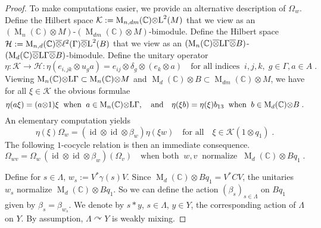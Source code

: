 \documentclass[a4paper,11pt]{amsart}
\numberwithin{equation}{section}
\begin{document}
\begin{proof}
To make computations easier, we provide an alternative description of ${\Omega}_w$. Define the Hilbert space ${\mathcal{K}} := {\operatorname{M}}_{n,d m}({\mathbb{C}}) {\otimes} {\mathord{\text{\rm L}}}^2(M)$ that we view as an $({\operatorname{M}}_n({\mathbb{C}}) {\otimes} M)$-$({\operatorname{M}}_{d m}({\mathbb{C}}) {\otimes} M)$-bimodule. Define the Hilbert space ${\mathcal{H}} := {\operatorname{M}}_{n,d}({\mathbb{C}}) {\mathbin{\overline{\otimes}}} \ell^2(\Gamma) {\mathbin{\overline{\otimes}}} {\mathord{\text{\rm L}}}^2(B)$ that we view as an $({\operatorname{M}}_n({\mathbb{C}}) {\mathbin{\overline{\otimes}}} {\mathord{\text{\rm L}}} \Gamma {\mathbin{\overline{\otimes}}} B)$-$({\operatorname{M}}_d({\mathbb{C}}) {\mathbin{\overline{\otimes}}} {\mathord{\text{\rm L}}} \Gamma {\mathbin{\overline{\otimes}}} B)$-bimodule. Define the unitary operator
$$\eta : {\mathcal{K}} {\rightarrow} {\mathcal{H}} : \eta(e_{i,jk} {\otimes} u_g a) = e_{ij} {\otimes} \delta_g {\otimes} (e_k {\otimes} a) \quad\text{for all indices}\;\; i,j,k, \;  g \in \Gamma, a \in A \; .$$
Viewing ${\operatorname{M}}_n({\mathbb{C}}) {\otimes} {\mathord{\text{\rm L}}} \Gamma \subset {\operatorname{M}}_n({\mathbb{C}}) {\otimes} M$ and ${\operatorname{M}}_d({\mathbb{C}}) {\otimes} B \subset {\operatorname{M}}_{d m}({\mathbb{C}}) {\otimes} M$, we have for all $\xi \in {\mathcal{K}}$ the obvious formulae
$$\eta(a \xi) = (a {\otimes} 1) \xi \;\;\text{when}\;\; a \in {\operatorname{M}}_n({\mathbb{C}}) {\otimes} {\mathord{\text{\rm L}}} \Gamma, \quad\text{and}\quad \eta(\xi b) = \eta(\xi) b_{13} \;\;\text{when}\;\; b \in {\operatorname{M}}_{d}({\mathbb{C}}) {\otimes} B \; .$$
An elementary computation yields
\begin{equation}\label{eq.goodformula}
\eta(\xi) {\Omega}_w = ({\mathord{\operatorname{id}}} {\otimes} {\mathord{\operatorname{id}}} {\otimes} \beta_w)\eta(\xi w) \quad\text{for all}\quad \xi \in {\mathcal{K}}(1 {\otimes} q_1) \; .
\end{equation}
The following $1$-cocycle relation is then an immediate consequence.
\begin{equation}\label{eq.cocycle}
\Omega_{wv} =  \Omega_w \, ({\mathord{\operatorname{id}}} {\otimes} {\mathord{\operatorname{id}}} {\otimes} \beta_w)(\Omega_v) \quad\text{when both}\;\; w,v \;\;\text{normalize}\;\; {\operatorname{M}}_d({\mathbb{C}}) {\otimes} Bq_1 \; .
\end{equation}

Define for $s \in \Lambda$, $w_s := V^* \gamma(s) V$. Since ${\operatorname{M}}_d({\mathbb{C}}) {\otimes} Bq_1 = V^* C V$, the unitaries $w_s$ normalize
${\operatorname{M}}_d({\mathbb{C}}) {\otimes} Bq_1$. So we can define the action $(\beta_s)_{s \in \Lambda}$ on $Bq_1$ given by $\beta_s = \beta_{w_s}$. We denote by $s * y$, $s \in \Lambda$, $y \in Y$, the corresponding action of $\Lambda$ on $Y$. By assumption, $\Lambda {\curvearrowright} Y$ is weakly mixing.


\end{proof}
\end{document}
